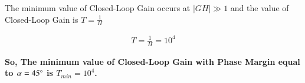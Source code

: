 \begin{enumerate}[label=\thesection.\arabic*.,ref=\thesection.\theenumi]
The minimum value of Closed-Loop Gain occurs at $|GH| \gg 1$ and the value of Closed-Loop Gain is $T=\frac{1}{H}$

\begin{align}
T = \frac{1}{H} = 10^{4}
\end{align}

\textbf{So, The minimum value of Closed-Loop Gain with Phase Margin equal to $\alpha=45\degree$ is $T_{min} = 10^{4}$.}\\
%
%
%

\end{enumerate}
